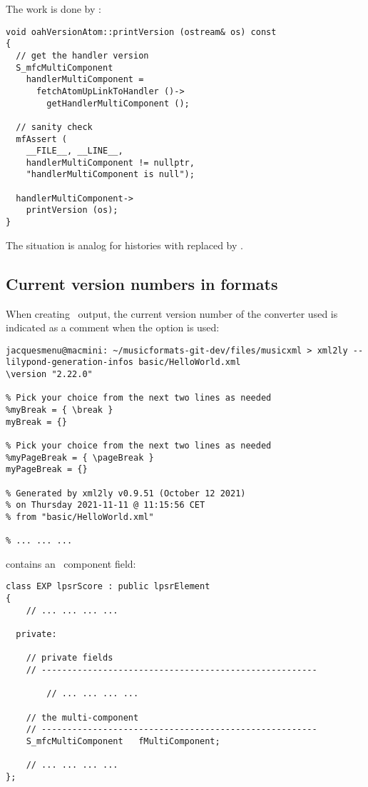 The work is done by :
\begin{lstlisting}[language=CPlusPlus]
void oahVersionAtom::printVersion (ostream& os) const
{
  // get the handler version
  S_mfcMultiComponent
    handlerMultiComponent =
      fetchAtomUpLinkToHandler ()->
        getHandlerMultiComponent ();

  // sanity check
  mfAssert (
    __FILE__, __LINE__,
    handlerMultiComponent != nullptr,
    "handlerMultiComponent is null");

  handlerMultiComponent->
    printVersion (os);
}
\end{lstlisting}

The situation is analog for histories with  replaced by .


\subsection{Current version numbers in formats}\label{Current version numbers in formats}

When creating \lily\ output, the current version number of the converter used is indicated as a comment when the  option is used:
\begin{lstlisting}[language=Terminal]
jacquesmenu@macmini: ~/musicformats-git-dev/files/musicxml > xml2ly --lilypond-generation-infos basic/HelloWorld.xml
\version "2.22.0"

% Pick your choice from the next two lines as needed
%myBreak = { \break }
myBreak = {}

% Pick your choice from the next two lines as needed
%myPageBreak = { \pageBreak }
myPageBreak = {}

% Generated by xml2ly v0.9.51 (October 12 2021)
% on Thursday 2021-11-11 @ 11:15:56 CET
% from "basic/HelloWorld.xml"

% ... ... ...
\end{lstlisting}

 contains an \mfcRepr\ component field:
\begin{lstlisting}[language=CPlusPlus]
class EXP lpsrScore : public lpsrElement
{
 	// ... ... ... ...

  private:

    // private fields
    // ------------------------------------------------------

	 	// ... ... ... ...

    // the multi-component
    // ------------------------------------------------------
    S_mfcMultiComponent   fMultiComponent;

 	// ... ... ... ...
};
\end{lstlisting}

